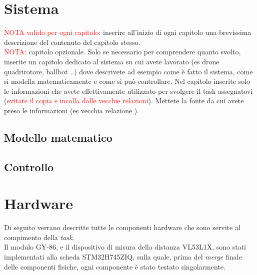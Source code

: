 \documentclass[11pt]{report}
\begin{document}
\newpage
\chapter{Sistema}
\textcolor{red}{NOTA valido per ogni capitolo: }inserire all'inizio di ogni capitolo una brevissima descrizione del contenuto del capitolo stesso.\\
\newline
\textcolor{red}{NOTA:} capitolo opzionale.
Solo se necessario per comprendere quanto svolto, inserite un capitolo dedicato al sistema su cui avete lavorato (es drone quadrirotore, ballbot ..) dove descrivete ad esempio come è fatto il sistema, come si modella matematicamente e come si può controllare. Nel capitolo inserite solo le informazioni che avete effettivamente utilizzato per svolgere il task assegnatovi (\textcolor{red}{evitate il copia e incolla dalle vecchie relazioni}). Mettete la fonte da cui avete preso le informazioni (es vecchia relazione \cite{Relazione1}).
\section{Modello matematico}
\section{Controllo}

\newpage
\chapter{Hardware}
\label{Hardware}
Di seguito verrano descritte tutte le componenti hardware che sono servite al compimento della \textit{task}.\\
Il modulo GY-86, e il dispositivo di misura della distanza VL53L1X, sono stati implementati alla scheda STM32H745ZIQ, sulla quale, prima del \textit{merge} finale delle componenti fisiche, ogni componente è stato testato singolarmente.
\end{document}
